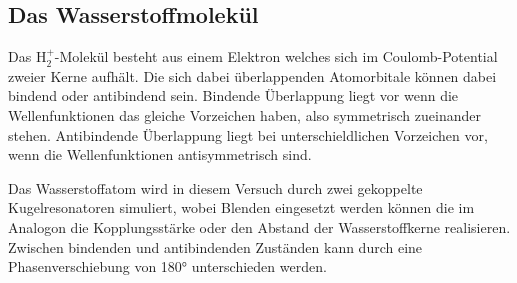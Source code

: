\subsection{Das Wasserstoffmolekül}

\noindent
Das $\text{H}^+_2$-Molekül besteht aus einem Elektron welches sich im Coulomb-Potential zweier Kerne aufhält.
Die sich dabei überlappenden Atomorbitale können dabei bindend oder antibindend sein.
Bindende Überlappung liegt vor wenn die Wellenfunktionen das gleiche Vorzeichen haben, also symmetrisch zueinander stehen.
Antibindende Überlappung liegt bei unterschieldlichen Vorzeichen vor, wenn die Wellenfunktionen antisymmetrisch sind.

\noindent
Das Wasserstoffatom wird in diesem Versuch durch zwei gekoppelte Kugelresonatoren simuliert, wobei Blenden eingesetzt werden können die im Analogon die Kopplungsstärke oder den Abstand der Wasserstoffkerne realisieren.
Zwischen bindenden und antibindenden Zuständen kann durch eine Phasenverschiebung von 180° unterschieden werden.
